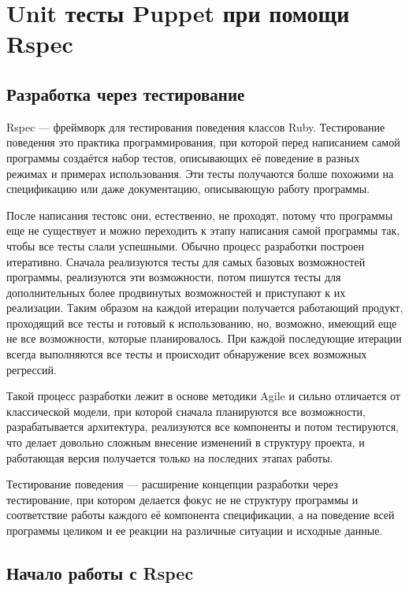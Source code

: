\chapter{Unit тесты Puppet при помощи Rspec}

\section{Разработка через тестирование}

Rspec --- фреймворк для тестирования поведения классов Ruby. Тестирование поведения это практика программирования, при которой перед написанием самой программы создаётся набор тестов, описывающих её поведение в разных режимах и примерах использования. Эти тесты получаются болше похожими на спецификацию или даже документацию, описывающую работу программы.

После написания тестовс они, естественно, не проходят, потому что программы еще не существует и можно переходить к этапу написания самой программы так, чтобы все тесты слали успешными. Обычно процесс разработки построен итеративно. Сначала реализуются тесты для самых базовых возможностей программы, реализуются эти возможности, потом пишутся тесты для дополнительных более продвинутых возможностей и приступают к их реализации. Таким образом на каждой итерации получается работающий продукт, проходящий все тесты и готовый к использованию, но, возможно, имеющий еще не все возможности, которые планировалось. При каждой последующие итерации всегда выполняются все тесты и происходит обнаружение всех возможных регрессий.

Такой процесс разработки лежит в основе методики Agile и сильно отличается от классической модели, при которой сначала планируются все возможности, разрабатывается архитектура, реализуются все компоненты и потом тестируются, что делает довольно сложным внесение изменений в структуру проекта, и работающая версия получается только на последних этапах работы.

Тестирование поведения --- расширение концепции разработки через тестирование, при котором делается фокус не не структуру программы и соответствие работы каждого её компонента спецификации, а на поведение всей программы целиком и ее реакции на различные ситуации и исходные данные.

\section{Начало работы с Rspec}


